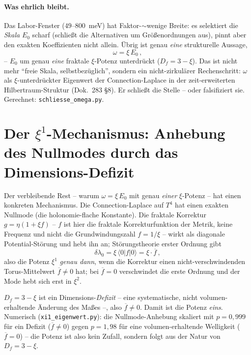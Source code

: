 \paragraph{Was ehrlich bleibt.} Das Labor-Fenster ($49$--$800$~meV) hat Faktor-$\sim$wenige Breite:
es selektiert die \emph{Skala} $E_0$ scharf (schließt die Alternativen um Größenordnungen aus), pinnt
aber den exakten Koeffizienten nicht allein. Übrig ist genau \emph{eine} strukturelle Aussage,
\begin{equation}
\omega=\xi\,E_0\,,
\end{equation}
-- $E_0$ um genau \emph{eine} fraktale $\xi$-Potenz unterdrückt ($D_f=3-\xi$). Das ist nicht mehr
\enquote{freie Skala, selbstbezüglich}, sondern ein nicht-zirkulärer Rechenschritt: $\omega$ als
$\xi$-unterdrückter Eigenwert der Connection-Laplace in der zeit-erweiterten Hilbertraum-Struktur
(Dok.~283 §8). Er schließt die Stelle -- oder falsifiziert sie. Gerechnet: \texttt{schliesse\_omega.py}.

\section{Der $\xi^1$-Mechanismus: Anhebung des Nullmodes durch das Dimensions-Defizit}
Der verbleibende Rest -- warum $\omega=\xi\,E_0$ mit genau \emph{einer} $\xi$-Potenz -- hat einen
konkreten Mechanismus. Die Connection-Laplace auf $T^4$ hat einen exakten Nullmode (die
holonomie-flache Konstante). Die fraktale Korrektur $g=\eta(1+\xi f)$ -- $f$ ist hier die fraktale
Korrekturfunktion der Metrik, keine Frequenz und nicht die Grundwindungszahl $f=1/\xi$ -- wirkt als diagonale
Potential-Störung und hebt ihn an; Störungstheorie erster Ordnung gibt
\begin{equation}
\delta\lambda_0 = \xi\,\langle 0|f|0\rangle = \xi\cdot\overline f\,,
\end{equation}
also die Potenz $\xi^1$ \emph{genau dann}, wenn die Korrektur einen nicht-verschwindenden
Torus-Mittelwert $\overline f\neq0$ hat; bei $\overline f=0$ verschwindet die erste Ordnung und der
Mode hebt sich erst in $\xi^2$.

$D_f=3-\xi$ ist ein Dimensions-\emph{Defizit} -- eine systematische, nicht volumen-erhaltende Änderung
des Maßes --, also $\overline f\neq0$. Damit ist die Potenz \emph{eins}. Numerisch
(\texttt{xi1\_eigenwert.py}): die Nullmode-Anhebung skaliert mit $p=0{,}999$ für ein Defizit
($\overline f\neq0$) gegen $p=1{,}98$ für eine volumen-erhaltende Welligkeit ($\overline f=0$) -- die
Potenz ist also kein Zufall, sondern folgt aus der Natur von $D_f=3-\xi$.

